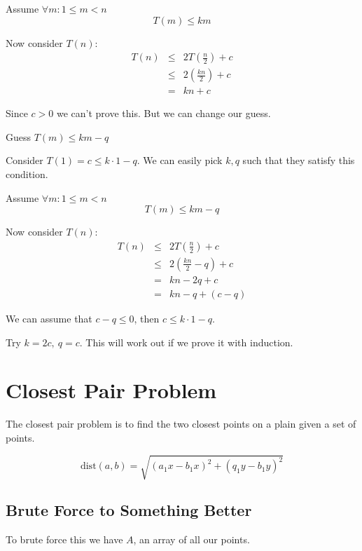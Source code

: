 \documentclass[12pt]{article}
\begin{document}
Assume $\forall m:1\leq m < n$
\begin{equation}
	T(m) \leq km
\end{equation}

Now consider $T(n)$:
\begin{eqnarray}
	T(n) &\leq& 2T(\frac{n}{2}) + c \\
	&\leq& 2\left(\frac{kn}{2}\right) + c\\
	&=&  kn + c
\end{eqnarray}

Since $c>0$ we can't prove this. But we can change our guess.

Guess $T(m) \leq km - q$

Consider $T(1) = c \leq k\cdot 1 - q$. We can easily pick $k,q$ such that they
satisfy this condition.

Assume $\forall m:1\leq m < n$
\begin{equation}
	T(m) \leq km - q
\end{equation}

Now consider $T(n)$:
\begin{eqnarray}
	T(n) &\leq& 2T(\frac{n}{2}) + c \\
	&\leq& 2\left(\frac{kn}{2}-q\right) + c\\
	&=&  kn -2q + c\\
	&=&  kn - q + (c-q)
\end{eqnarray}

We can assume that $c-q\leq 0$, then $c \leq k\cdot 1 - q$.

Try $k=2c,\ q=c$. This will work out if we prove it with induction.

\section{Closest Pair Problem}

The closest pair problem is to find the two closest points on a plain given a
set of points.

\begin{equation}
	\text{dist}(a,b) = \sqrt{\left( a_1x - b_1x \right)^2 +
	\left( q_1y - b_1y \right)^2}
\end{equation}

\subsection{Brute Force to Something Better}

To brute force this we have $A$, an array of all our points.
\end{document}
